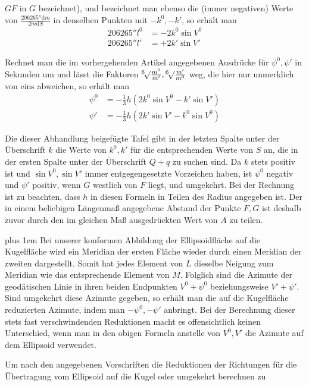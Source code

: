 %
\(GF\) in \(G\) bezeichnet), und bezeichnet man ebenso die (immer negativen) Werte von \(\tfrac{206265''\mathrm{d}m}{2m\mathrm{d}S}\) in denselben Punkten mit \(-k^0,-k'\), so erhält man
\[
\begin{aligned}
206265''l^0&=-2k^0\sin V^0\\
206265''l'&=+2k'\sin V'
\end{aligned}
\]

Rechnet man die im vorhergehenden Artikel angegebenen Ausdrücke für \(\psi^0,\psi'\) in Sekunden um und lässt die Faktoren \(\BareRoot[6]{\tfrac{m^0}{m'}},\BareRoot[6]{\tfrac{m'}{m^0}}\) weg, die hier nur unmerklich von eins abweichen, so erhält man
\[
\begin{aligned}
\psi^0&=-\tfrac{1}{3}h(2k^0\sin V^0-k'\sin V')\\
\psi'&=-\tfrac{1}{3}h(2k'\sin V'-k^0\sin V^0)
\end{aligned}
\]

Die dieser Abhandlung beigefügte Tafel gibt in der letzten Spalte unter der Überschrift \(k\) die Werte von \(k^0,k'\) für die entsprechenden Werte von \(S\) an, die in der ersten Spalte unter der Überschrift \(Q+q\) zu suchen sind. Da \(k\) stets positiv ist und \(\sin V^0,\sin V'\) immer entgegengesetzte Vorzeichen haben, ist \(\psi^0\) negativ und \(\psi'\) positiv, wenn \(G\) westlich von \(F\) liegt, und umgekehrt. Bei der Rechnung ist zu beachten, dass \(h\) in diesen Formeln in Teilen des Radius angegeben ist. Der in einem beliebigen Längenmaß angegebene Abstand der Punkte \(F,G\) ist deshalb zuvor durch den im gleichen Maß ausgedrückten Wert von \(A\) zu teilen.

\begingroup\rightskip=0pt plus 1em
Bei unserer konformen Abbildung der Ellipsoidfläche auf die Kugelfläche wird ein Meridian der ersten Fläche wieder durch einen Meridian der zweiten dargestellt. Somit hat jedes Element von \(L\) dieselbe Neigung zum Meridian wie das entsprechende Element von \(M\). Folglich sind die Azimute der geodätischen Linie in ihren beiden Endpunkten \(V^0+\psi^0\) beziehungsweise \(V'+\psi'\). Sind umgekehrt diese Azimute gegeben, so erhält man die auf die Kugelfläche reduzierten Azimute, indem man \(-\psi^0,-\psi'\) anbringt. Bei der Berechnung dieser stets fast verschwindenden Reduktionen macht es offensichtlich keinen Unterschied, wenn man in den obigen Formeln anstelle von \(V^0,V'\) die Azimute auf dem Ellipsoid verwendet.\par\endgroup

Um nach den angegebenen Vorschriften die Reduktionen der Richtungen für die Übertragung vom Ellipsoid auf die Kugel oder umgekehrt berechnen zu
